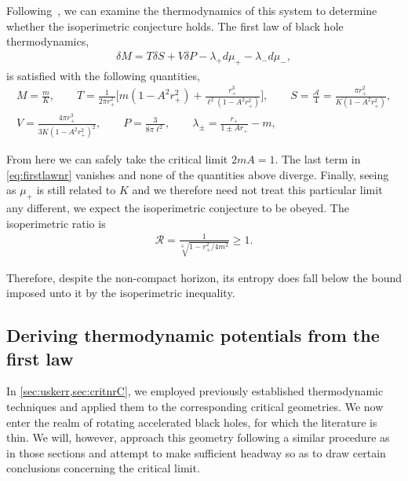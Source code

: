 \documentclass[
twoside,openright,frontopenright]{dmathesis}
\newcommand{\nn}{\nonumber}
\newcommand{\todoopt}[2][]{\todo[color=blue!20,size=\footnotesize,#1]{#2}}
\begin{document}

Following~\cite{Appels:2016uha,Appels:2017xoe}, we can examine the
thermodynamics of this system to determine whether the isoperimetric conjecture
holds. The first law of black hole thermodynamics,
\begin{align}\label{eq:firstlawnr}
\delta M = T\delta S + V\delta P - \lambda_+ d\mu_+ - \lambda_- d\mu_-,
\end{align}
is satisfied with the following quantities,
\begin{gather}
M=\frac{m}{K},\qquad T=\frac{1}{2\pi
  r_+^2}\bigg[m(1-A^2 r_+^2) + \frac{r_+^3}{\ell^2(1-A^2 r_+^2)}\bigg], \qquad
S=\frac{\mathcal{A}}{4} = \frac{\pi r_+^2}{K(1- A^2 r_+^2)},\nn\\ 
V=\frac{4 \pi  r_+^3}{3 K (1- A^2 r_+^2)^2}, \qquad P=\frac{3}{8\pi \ell^2},
\qquad \lambda_\pm = \frac{r_+}{1\pm A r_+} - m,
\end{gather}

From here we can safely take the critical limit $2mA = 1$. The last term in
\cref{eq:firstlawnr} vanishes and none of the quantities above diverge. Finally,
seeing as $\mu_+$ is still related to $K$ and we therefore need not treat this
particular limit any different, we expect the isoperimetric
conjecture to be obeyed. The isoperimetric ratio is
\begin{align}
\mathcal{R} = \frac{1}{\sqrt[6]{1-r_+^2/4m^2}}\geqslant 1.
\end{align}

Therefore, despite the non-compact horizon, its entropy does fall below the
bound imposed unto it by the isoperimetric inequality. 

\subsection{Deriving thermodynamic potentials from the first law}
In \cref{sec:uskerr,sec:critnrC}, we employed previously established
thermodynamic techniques and applied them to the corresponding critical
geometries. We now enter the realm of rotating accelerated black holes, for
which the literature is thin. \todoopt{mention astorino somehow} We will,
however, approach this geometry following a similar procedure as in those
sections and attempt to make sufficient headway so as to draw certain
conclusions concerning the critical limit. 
\end{document}
